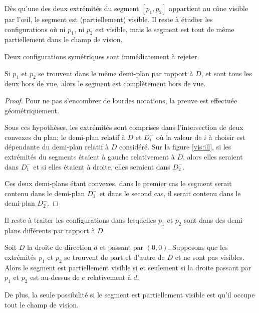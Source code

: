 Dès qu'une des deux extrémités du segment $[p_1, p_2]$ appartient au
cône visible par l'\oe{}il, le segment est (partiellement)
visible. Il reste à étudier les configurations où ni $p_1$, ni $p_2$ est
visible, mais le segment est tout de même partiellement dans le champ de vision.

Deux configurations symétriques sont immédiatement à rejeter.
\begin{obs}
  Si $p_1$ et $p_2$ se trouvent dans le même demi-plan par rapport à $D$,
  et sont tous les deux hors de vue, alors le segment est complètement hors de vue.
\end{obs}
\begin{proof}
  Pour ne pas s'encombrer de lourdes notations, la preuve est effectuée
  géométriquement.

  Sous ces hypothèses, les extrémités sont comprises dans l'intersection
  de deux convexes du plan; le demi-plan relatif à $D$ et $D_i^-$ où la valeur
  de $i$ à choisir est dépendante du demi-plan relatif à $D$ considéré.
  Sur la figure \ref{vis:ill}, si les extrémités du segments étaient
  à gauche relativement à $D$, alors elles seraient dans $D_1^-$ et
  si elles étaient à droite, elles seraient dans $D_2^-$.

  Ces deux demi-plans étant convexes, dans le premier cas le
  segment serait contenu dans le demi-plan $D_1^-$ et dans le second
  cas, il serait contenu dans le demi-plan $D_2^-$.
\end{proof}

Il reste à traiter les configurations dans lesquelles $p_1$
et $p_2$ sont dans des demi-plans différents par rapport à $D$.

\begin{obs}\label{obs:couvr}
  Soit $D$ la droite de direction $d$ et passant par $(0, 0)$.
  Supposons que les extrémités $p_1$ et $p_2$ se trouvent
  de part et d'autre de $D$ et ne sont pas visibles.
  Alors le segment est partiellement visible
  si et seulement si la droite passant par $p_1$
  et $p_2$ est \og au-dessus\fg{} de $e$ relativement à $d$.

  De plus, la seule possibilité si le segment est partiellement
  visible est qu'il occupe tout le champ de vision.
\end{obs}

